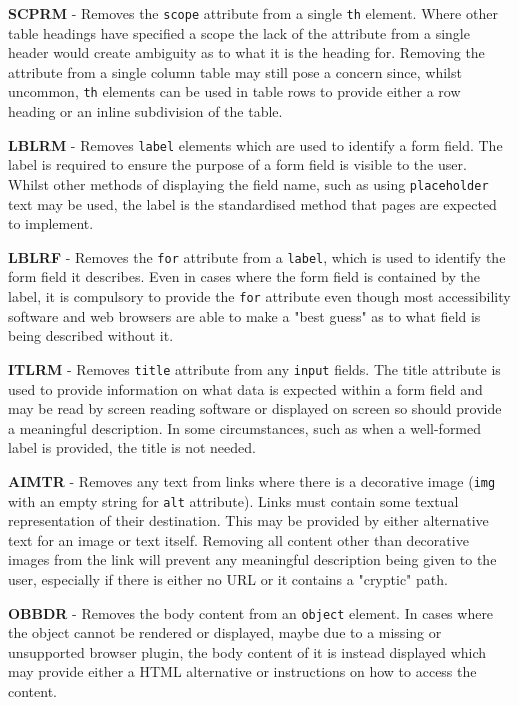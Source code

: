 \textbf{SCPRM} - Removes the \texttt{scope} attribute from a single \texttt{th} element. Where other table headings have specified a scope the lack of the attribute from a single header would create ambiguity as to what it is the heading for. Removing the attribute from a single column table may still pose a concern since, whilst uncommon, \texttt{th} elements can be used in table rows to provide either a row heading or an inline subdivision of the table.

\textbf{LBLRM} - Removes \texttt{label} elements which are used to identify a form field. The label is required to ensure the purpose of a form field is visible to the user. Whilst other methods of displaying the field name, such as using \texttt{placeholder} text may be used, the label is the standardised method that pages are expected to implement.

\textbf{LBLRF} - Removes the \texttt{for} attribute from a \texttt{label}, which is used to identify the form field it describes. Even in cases where the form field is contained by the label, it is compulsory to provide the \texttt{for} attribute even though most accessibility software and web browsers are able to make a "best guess" as to what field is being described without it.

\textbf{ITLRM} - Removes \texttt{title} attribute from any \texttt{input} fields. The title attribute is used to provide information on what data is expected within a form field and may be read by screen reading software or displayed on screen so should provide a meaningful description. In some circumstances, such as when a well-formed label is provided, the title is not needed.

\textbf{AIMTR} - Removes any text from links where there is a decorative image (\texttt{img} with an empty string for \texttt{alt} attribute). Links must contain some textual representation of their destination. This may be provided by either alternative text for an image or text itself. Removing all content other than decorative images from the link will prevent any meaningful description being given to the user, especially if there is either no URL or it contains a "cryptic" path.

\textbf{OBBDR} - Removes the body content from an \texttt{object} element. In cases where the object cannot be rendered or displayed, maybe due to a missing or unsupported browser plugin, the body content of it is instead displayed which may provide either a HTML alternative or instructions on how to access the content.

